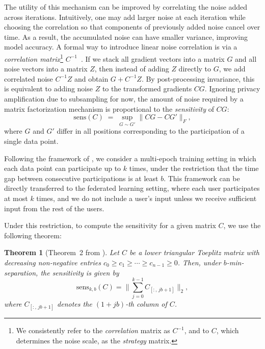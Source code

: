 \documentclass{article}
\theoremstyle{plain}
\newtheorem{theorem}{Theorem} %
\theoremstyle{definition}
\theoremstyle{remark}
\begin{document}
The utility of this mechanism can be improved by correlating the noise added across
iterations. Intuitively, one may add larger noise at each iteration while choosing the
correlation so that components of previously added noise cancel over time. As a result,
the accumulated noise can have smaller variance, improving model accuracy. A formal way
to introduce linear noise correlation is via a \emph{correlation matrix}\footnote{We 
consistently refer to the \emph{correlation} matrix as $C^{-1}$, and to $C$, which determines 
the noise scale, as the \emph{strategy} matrix.}
$C^{-1}$~\citep{Li_MF, Denisov, choquette2022multi}. If we stack all gradient vectors into
a matrix $G$ and all noise vectors into a matrix $Z$, then instead of adding $Z$
directly to $G$, we add correlated noise $C^{-1}Z$ and obtain $G + C^{-1}Z$.
By post-processing invariance, this is equivalent to adding noise $Z$ to the transformed
gradients $CG$. Ignoring privacy amplification due to subsampling for now, the amount of
noise required by a matrix factorization mechanism is proportional to the
\textit{sensitivity} of $CG$:
%
\begin{equation}
    \mathrm{sens}(C)
    \;=\;
    \sup_{G \sim G'} \|CG - CG'\|_F,
\end{equation}
%
where $G$ and $G'$ differ in all positions corresponding to the participation of a single
data point.

Following the framework of \citep{choquette2023amplified}, we consider a multi-epoch training setting in which each data point can participate up to $k$ times, under the restriction that the time gap between consecutive participations is at least $b$. This framework can be directly transferred to the federated learning setting, where each user participates at most $k$ times, and we do not include a user’s input unless we receive sufficient input from the rest of the users.

Under this restriction, to compute the sensitivity for a given matrix $C$, we use the following theorem:

\begin{theorem}[Theorem~2 from \citet{kalinin2024}]
\label{thm:sensitivity}
Let $C$ be a lower triangular Toeplitz matrix with decreasing non-negative entries
$c_0 \ge c_1 \ge \cdots \ge c_{n-1} \ge 0$.
Then, under $b$-min-separation, the sensitivity is given by
%
\begin{equation}
    \mathrm{sens}_{k,b}(C)
    = \Big\| \sum_{j=0}^{k-1} C_{[:,\,jb + 1]} \Big\|_2,
\end{equation}
where $C_{[:,\,jb + 1]}$ denotes the $(1+jb)$-th column of $C$.
\end{theorem}
\end{document}

